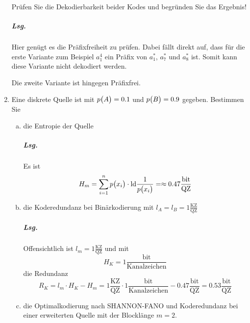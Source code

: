 \documentclass{scrreprt}
\newcommand{\ld}{\text{ld}}
\begin{document}
\begin{enumerate}[1.]

  Prüfen Sie die Dekodierbarkeit beider Kodes und begründen Sie das Ergebnis!

  \subparagraph{Lsg.} Hier genügt es die Präfixfreiheit zu prüfen.
  Dabei fällt direkt auf, dass für die erste Variante zum Beispiel $a_1^4$ ein
  Präfix von $a_1^*$, $a_7^*$ und $a_8^*$ ist.
  Somit kann diese Variante nicht dekodiert werden.

  Die zweite Variante ist hingegen Präfixfrei.

\item Eine diskrete Quelle ist mit $p\qty\big(A) = 0.1$ und $p\qty\big(B) = 0.9$
  gegeben.
  Bestimmen Sie
  \begin{enumerate}[(a)]
  \item die Entropie der Quelle

    \subparagraph{Lsg.} Es ist
    \[
      H_m = \sum_{i = 1}^n p\qty\big(x_i) \cdot \ld \frac{1}{p\qty\big(x_i)} = \approx 0.47 \frac{\text{bit}}{\text{QZ}}
    \]

  \newpage
  \item die Koderedundanz bei Binärkodierung mit
    $l_A = l_B = 1 \frac{\text{KZ}}{\text{QZ}}$

    \subparagraph{Lsg.} Offensichtlich ist $l_m = 1 \frac{\text{KZ}}{\text{QZ}}$ und
    mit
    \[
      H_K = 1 \frac{\text{bit}}{\text{Kanalzeichen}}
    \]
    die Redundanz
    \[
      R_K = l_m \cdot H_K - H_m = 1 \frac{\text{KZ}}{\text{QZ}} \cdot 1 \frac{\text{bit}}{\text{Kanalzeichen}} - 0.47 \frac{\text{bit}}{\text{QZ}} = 0.53 \frac{\text{bit}}{\text{QZ}}
    \]

  \item die Optimalkodierung nach SHANNON-FANO und Koderedundanz bei einer
    erweiterten Quelle mit der Blocklänge $m = 2$.


\end{enumerate}
\end{enumerate}
\end{document}
